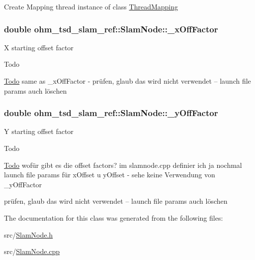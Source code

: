 Create Mapping thread instance of class \hyperlink{classohm__tsd__slam__ref_1_1ThreadMapping}{Thread\-Mapping} \hypertarget{classohm__tsd__slam__ref_1_1SlamNode_ad57ec9810293549dc803209a950a776f}{
\subsubsection[{\-\_\-x\-Off\-Factor}]{\setlength{\rightskip}{0pt plus 5cm}double ohm\-\_\-tsd\-\_\-slam\-\_\-ref\-::\-Slam\-Node\-::\-\_\-x\-Off\-Factor\hspace{0.3cm}{\ttfamily [private]}}}\label{classohm__tsd__slam__ref_1_1SlamNode_ad57ec9810293549dc803209a950a776f}
X starting offset factor \begin{DoxyRefDesc}{Todo}
\item[\hyperlink{todo__todo000012}{Todo}]same as \-\_\-x\-Off\-Factor -\/ prüfen, glaub das wird nicht verwendet -- launch file params auch löschen \end{DoxyRefDesc}
\hypertarget{classohm__tsd__slam__ref_1_1SlamNode_a591fdd2fc92e9fd53112b36f0125cf51}{
\subsubsection[{\-\_\-y\-Off\-Factor}]{\setlength{\rightskip}{0pt plus 5cm}double ohm\-\_\-tsd\-\_\-slam\-\_\-ref\-::\-Slam\-Node\-::\-\_\-y\-Off\-Factor\hspace{0.3cm}{\ttfamily [private]}}}\label{classohm__tsd__slam__ref_1_1SlamNode_a591fdd2fc92e9fd53112b36f0125cf51}
Y starting offset factor \begin{DoxyRefDesc}{Todo}
\item[\hyperlink{todo__todo000013}{Todo}]wofür gibt es die offset factors? im slamnode.\-cpp definier ich ja nochmal launch file params für x\-Offset u y\-Offset -\/ sehe keine Verwendung von \-\_\-y\-Off\-Factor 

prüfen, glaub das wird nicht verwendet -- launch file params auch löschen \end{DoxyRefDesc}


The documentation for this class was generated from the following files\-:\begin{DoxyCompactItemize}
\item 
src/\hyperlink{SlamNode_8h}{Slam\-Node.\-h}\item 
src/\hyperlink{SlamNode_8cpp}{Slam\-Node.\-cpp}\end{DoxyCompactItemize}
